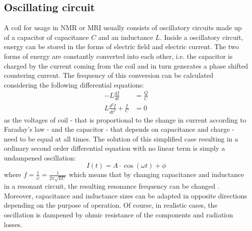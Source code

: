             \subsection{Oscillating circuit}
                A coil for usage in NMR or MRI usually consists of oscillatory circuits made up of a capacitor of capacitance $C$ and an inductance $L$. Inside a oscillatory circuit, energy can be stored in the forms of electric field and electric current. The two forms of energy are constantly converted into each other, i.e. the capacitor is charged by the current coming from the coil and in turn generates a phase shifted countering current. The frequency of this conversion can be calculated considering the following differential equations:
                \begin{equation}
                    \begin{aligned}
                        -L\frac{dI}{dt} &= \frac{Q}{C} \\
                        L\frac{d^2I}{dt^2} + \frac{I}{C} &= 0
                    \end{aligned}
                \end{equation}
                as the voltages of coil - that is proportional to the change in current according to Faraday's law - and the capacitor - that depends on capacitance and charge - need to be equal at all times. The solution of this simplified case resulting in a ordinary second order differential equation with no linear term is simply a undampened oscillation:
                \begin{equation}
                    I(t) =  A \cdot \cos(\omega t) + \phi 
                \end{equation}
                where $f= \frac{1}{\omega} = \frac{1}{2\pi\sqrt{LC}}$ which means that by changing capacitance and inductance in a resonant circuit, the resulting resonance frequency can be changed \cite{rao_electronic_2011}. Moreover, capacitance and inductance sizes can be adapted in opposite directions depending on the purpose of operation.
                Of course, in realistic cases, the oscillation is dampened by ohmic resistance of the components and radiation losses.
